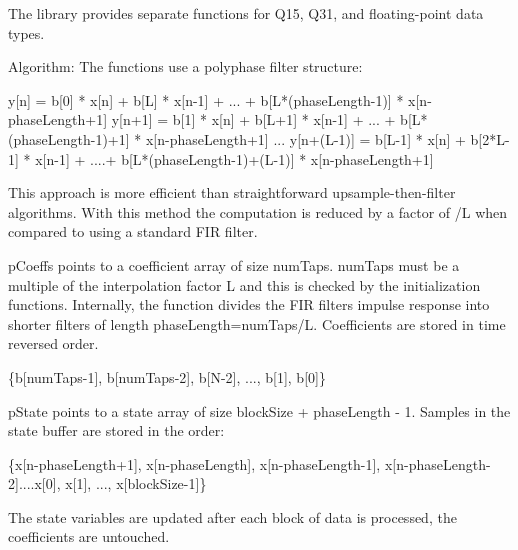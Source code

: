 The library provides separate functions for Q15, Q31, and floating-\/point data types.

\begin{DoxyParagraph}{Algorithm\+:}
The functions use a polyphase filter structure\+: 
\begin{DoxyPre}
   y[n] = b[0] * x[n] + b[L]   * x[n-1] + ... + b[L*(phaseLength-1)] * x[n-phaseLength+1]
   y[n+1] = b[1] * x[n] + b[L+1] * x[n-1] + ... + b[L*(phaseLength-1)+1] * x[n-phaseLength+1]
   ...
   y[n+(L-1)] = b[L-1] * x[n] + b[2*L-1] * x[n-1] + ....+ b[L*(phaseLength-1)+(L-1)] * x[n-phaseLength+1]
\end{DoxyPre}
 This approach is more efficient than straightforward upsample-\/then-\/filter algorithms. With this method the computation is reduced by a factor of {/L} when compared to using a standard F\+IR filter. 
\end{DoxyParagraph}
\begin{DoxyParagraph}{}
{\ttfamily p\+Coeffs} points to a coefficient array of size {\ttfamily num\+Taps}. {\ttfamily num\+Taps} must be a multiple of the interpolation factor {\ttfamily L} and this is checked by the initialization functions. Internally, the function divides the F\+IR filter\textquotesingle{}s impulse response into shorter filters of length {\ttfamily phase\+Length=num\+Taps/L}. Coefficients are stored in time reversed order. 
\end{DoxyParagraph}
\begin{DoxyParagraph}{}

\begin{DoxyPre}
   \{b[numTaps-1], b[numTaps-2], b[N-2], ..., b[1], b[0]\}
\end{DoxyPre}
 
\end{DoxyParagraph}
\begin{DoxyParagraph}{}
{\ttfamily p\+State} points to a state array of size {\ttfamily block\+Size + phase\+Length -\/ 1}. Samples in the state buffer are stored in the order\+: 
\end{DoxyParagraph}
\begin{DoxyParagraph}{}

\begin{DoxyPre}
   \{x[n-phaseLength+1], x[n-phaseLength], x[n-phaseLength-1], x[n-phaseLength-2]....x[0], x[1], ..., x[blockSize-1]\}
\end{DoxyPre}
 The state variables are updated after each block of data is processed, the coefficients are untouched.
\end{DoxyParagraph}

